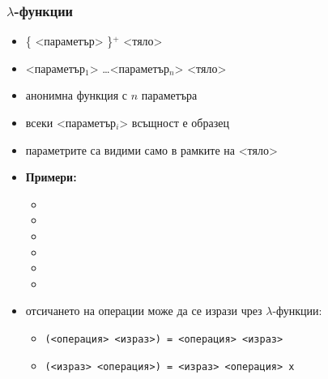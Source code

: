 \documentclass[alsotrans]{beamerswitch}
\begin{document}
\begin{frame}
  \frametitle{$\lambda$-функции}  \begin{itemize}[<+->]

  \item \tta{\textbackslash}\{ <параметър> \}$^+$ \tta{->} <тяло>
  \item \tta{\textbackslash} <параметър$_1$> \ldots <параметър$_n$> \tta{->} <тяло>
  \item анонимна функция с $n$ параметъра
  \item всеки <параметър$_i$> всъщност е образец
  \item параметрите са видими само в рамките на <тяло>
  \item \textbf{Примери:}
    \begin{itemize}
    \item {}
    \item {}
    \item {}
    \item {}
    \item {}
    \item {}
    \end{itemize}
  \item отсичането на операции може да се изрази чрез $\lambda$-функции:
    \begin{itemize}
    \item \tt(<операция> <израз>\tt) =  <операция> <израз>
    \item \tt(<израз> <операция>\tt) = \lst{\\x ->}  <израз> <операция> \tt x
    \end{itemize}
  \end{itemize}
\end{frame}
\end{document}

